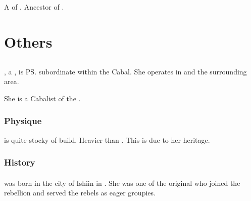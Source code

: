 \section{\Quelthah}
\index{\Quelthah}
A \sathariah \resphan{} of \TiphredSerah. 
Ancestor of . 






















\chapter{Others}
\section{\Achsah}
\Achsah{}, a \resvil{}, is \ps{\Teshrial} subordinate within the Cabal. 
She operates in \Malcur and the surrounding area. 

She is a Cabalist of the . 







\subsection{Physique}
\Achsah{} is quite stocky of build. 
Heavier than \Teshrial. 
This is due to her \nephilic{} heritage. 







\subsection{History}





\subsubsection{\Merkyrah}
\Achsah{} was born in the city of Ishiin in \Merkyrah. 
She was one of the original  who joined the rebellion and served the rebels as eager groupies. 

